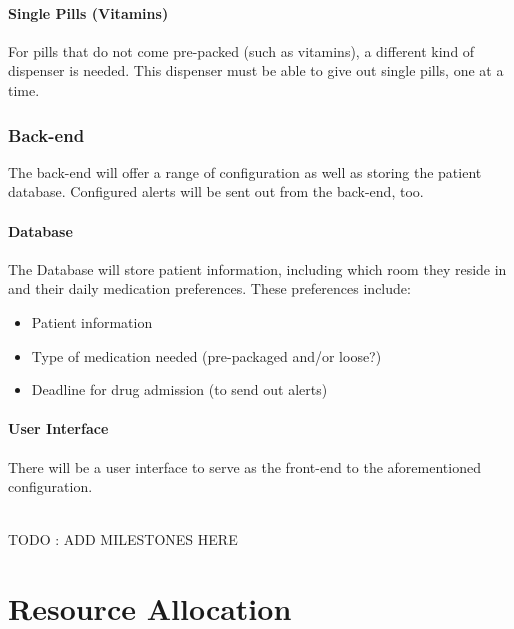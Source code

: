 \documentclass[a4paper,10pt,DIV10,openright,openbib]{scrreprt}
\begin{document}
\subsubsection{Single Pills (Vitamins)} For pills that do not come pre-packed
(such as vitamins), a different kind of dispenser is needed. This dispenser must
be able to give out single pills, one at a time.

\subsection{Back-end}
The back-end will offer a range of configuration as well as storing the patient
database. Configured alerts will be sent out from the back-end, too.
\subsubsection{Database} The Database will store patient information, including
which room they reside in and their daily medication preferences. These
preferences include:
\begin{itemize}
  \item Patient information
  \item Type of medication needed (pre-packaged and/or loose?)
  \item Deadline for drug admission (to send out alerts)
\end{itemize}
\subsubsection{User Interface} There will be a user interface to serve as the
front-end to the aforementioned configuration.

\\ TODO : ADD MILESTONES HERE \newpage

{\let\clearpage\relax \chapter{Resource Allocation}}
\end{document}
